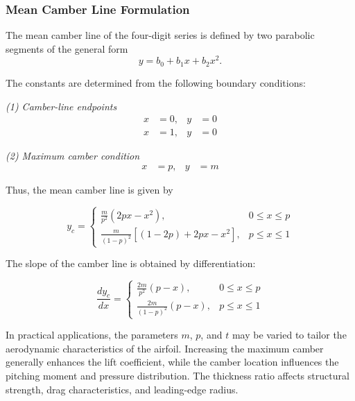 
\subsubsection*{Mean Camber Line Formulation}

The mean camber line of the four-digit series is defined by two parabolic 
segments of the general form
\[
y = b_0 + b_1 x + b_2 x^2 .
\]

The constants are determined from the following boundary conditions:

\bigskip

\textit{(1) Camber-line endpoints}
\begin{align*}
x &= 0, & y &= 0 \\
x &= 1, & y &= 0
\end{align*}

\textit{(2) Maximum camber condition}
\begin{align*}
x &= p, & y &= m
\end{align*}

Thus, the mean camber line is given by

\begin{equation}
y_c =
\begin{cases}
\displaystyle 
\frac{m}{p^2}(2px - x^2),
& 0 \le x \le p \\[12pt]

\displaystyle 
\frac{m}{(1-p)^2}
\left[(1-2p) + 2px - x^2 \right],
& p \le x \le 1
\end{cases}
\label{naca_4-digit_mean_camber}
\end{equation}

The slope of the camber line is obtained by differentiation:

\begin{equation}
\frac{dy_c}{dx} =
\begin{cases}
\displaystyle 
\frac{2m}{p^2}(p - x),
& 0 \le x \le p \\[12pt]

\displaystyle 
\frac{2m}{(1-p)^2}(p - x),
& p \le x \le 1
\end{cases}
\end{equation}

In practical applications, the parameters $m$, $p$, and $t$ may be varied 
to tailor the aerodynamic characteristics of the airfoil. 
Increasing the maximum camber generally enhances the lift coefficient, 
while the camber location influences the pitching moment and pressure distribution. 
The thickness ratio affects structural strength, drag characteristics, and 
leading-edge radius.

